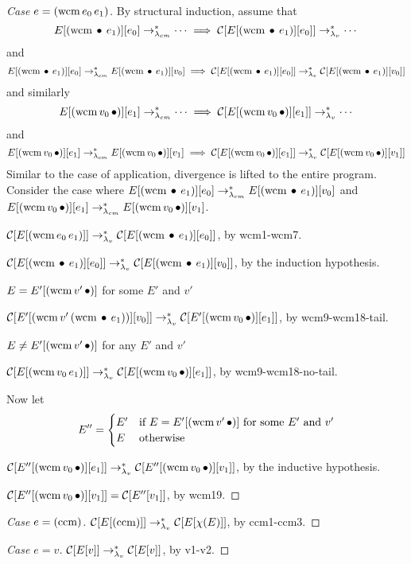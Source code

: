 \begin{proof}[Case $e=\wcm{e_0}{e_1}$]
By structural induction, assume that 
\[
E[\wcm{\hole}{e_1}][e_0]\cmrrs\cdots\implies\C{E[\wcm{\hole}{e_1}][e_0]}\lvrrs\cdots
\]
and
\[
E[\wcm{\hole}{e_1}][e_0]\cmrrs E[\wcm{\hole}{e_1}][v_0]\implies\C{E[\wcm{\hole}{e_1}][e_0]}\lvrrs\C{E[\wcm{\hole}{e_1}][v_0]}
\]
and similarly
\[
E[\wcm{v_0}{\hole}][e_1]\cmrrs\cdots\implies\C{E[\wcm{v_0}{\hole}][e_1]}\lvrrs\cdots
\]
and
\[
E[\wcm{v_0}{\hole}][e_1]\cmrrs E[\wcm{v_0}{\hole}][v_1]\implies\C{E[\wcm{v_0}{\hole}][e_1]}\lvrrs\C{E[\wcm{v_0}{\hole}][v_1]}
\]
Similar to the case of application, divergence is lifted to the entire program. Consider the case where $E[\wcm{\hole}{e_1}][e_0]\cmrrs E[\wcm{\hole}{e_1}][v_0]$ and $E[\wcm{v_0}{\hole}][e_1]\cmrrs E[\wcm{v_0}{\hole}][v_1]$.


$\C{E[\wcm{e_0}{e_1}]}\lvrrs\C{E[\wcm{\hole}{e_1}][e_0]}$, by wcm1-wcm7.

$\C{E[\wcm{\hole}{e_1}][e_0]}\lvrrs\C{E[\wcm{\hole}{e_1}][v_0]}$, by the induction hypothesis.

\begin{case}{$E=E'[\wcm{v'}{\hole}]$ for some $E'$ and $v'$}

$\C{E'[\wcm{v'}{\wcm{\hole}{e_1}}][v_0]}\lvrrs\C{E'[\wcm{v_0}{\hole}][e_1]}$, by wcm9-wcm18-tail.
\end{case}

\begin{case}{$E\ne E'[\wcm{v'}{\hole}]$ for any $E'$ and $v'$}

$\C{E[\wcm{v_0}{e_1}]}\lvrrs\C{E[\wcm{v_0}{\hole}][e_1]}$, by wcm9-wcm18-no-tail.
\end{case}

Now let 
\[
E''=\begin{cases}
E' &\text{if $E=E'[\wcm{v'}{\hole}]$ for some $E'$ and $v'$}\\
E  &\text{otherwise}
\end{cases}
\]

$\C{E''[\wcm{v_0}{\hole}][e_1]}\lvrrs\C{E''[\wcm{v_0}{\hole}][v_1]}$, by the inductive hypothesis.

$\C{E''[\wcm{v_0}{\hole}][v_1]}=\C{E''[v_1]}$, by wcm19.

\end{proof}

\begin{proof}[Case $e=\ccm$]
$\C{E[\ccm]}\lvrrs\C{E[\chi(E)]}$, by ccm1-ccm3.
\end{proof}

\begin{proof}[Case $e=v$]
$\C{E[v]}\lvrrs\C{E[v]}$, by v1-v2.
\end{proof}

